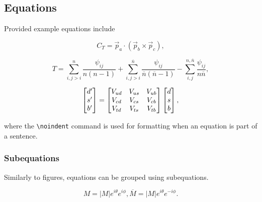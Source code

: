\documentclass[a4paper]{article}
\begin{document}
\subsection{Equations}
\label{sec:theory_equations}
Provided example equations include

\begin{equation}
    C_{T}=\vec{p}_{a} \cdot (\vec{p}_{b} \times \vec{p}_{c}),
    \label{eq:triple_product}
\end{equation}

\begin{equation}
    T=\sum^{n}_{i,j>i}\frac{\psi_{ij}}{n(n-1)}+\sum^{\overline{n}}_{i,j>i}\frac{\psi_{ij}}{\overline{n}(\overline{n}-1)}-\sum^{n,\overline{n}}_{i,j}\frac{\psi_{ij}}{n\overline{n}},
    \label{eq:et_test_statistic}
\end{equation}

\begin{equation}
    \begin{bmatrix}
        d' \\
        s' \\
        b'
    \end{bmatrix}
    =
    \begin{bmatrix}
        {\ensuremath{V_{{u}{d}}}} & {V_{{u}{s}}} & {V_{{u}{b}}} \\
        {V_{{c}{d}}} & {V_{{c}{s}}} & {V_{{c}{b}}} \\
        {V_{{t}{d}}} & {V_{{t}{s}}} & {V_{{t}{b}}}
    \end{bmatrix}
    \begin{bmatrix}
        d \\
        s \\
        b
    \end{bmatrix},
    \label{eq:CKM_general}
\end{equation}

\noindent where the \texttt{\textbackslash noindent} command is used for formatting when an equation is part of a sentence.

\subsubsection{Subequations}
\label{sec:theory_equations_subequations}
Similarly to figures, equations can be grouped using subequations.

\begin{subequations}
\begin{equation}
    M=|M|e^{i\theta}e^{i\phi},
\end{equation}
\begin{equation}
    \overline{M}=|M|e^{i\theta}e^{-i\phi}.
\end{equation}
\end{subequations}
\end{document}
